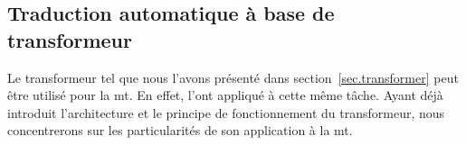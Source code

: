 \subsection{Traduction automatique à base de transformeur}
\label{subsec.nmt-transformer}

Le transformeur tel que nous l'avons présenté dans section~\ref{sec.transformer}
peut être utilisé pour la \gls{mt}.
En effet, \cite{attention} l'ont appliqué à cette même tâche.
Ayant déjà introduit l'architecture et le principe de fonctionnement du transformeur,
nous concentrerons sur les particularités de son application à la \gls{mt}.